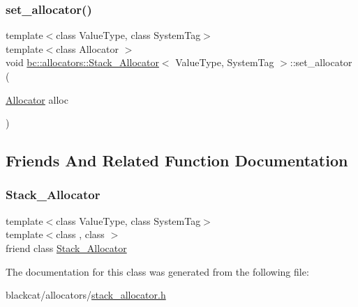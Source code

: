\subsubsection{\texorpdfstring{set\+\_\+allocator()}{set\_allocator()}}
{\footnotesize\ttfamily template$<$class Value\+Type, class System\+Tag$>$ \\
template$<$class Allocator $>$ \\
void \hyperlink{classbc_1_1allocators_1_1Stack__Allocator}{bc\+::allocators\+::\+Stack\+\_\+\+Allocator}$<$ Value\+Type, System\+Tag $>$\+::set\+\_\+allocator (\begin{DoxyParamCaption}\item[{\hyperlink{classbc_1_1allocators_1_1Allocator}{Allocator}}]{alloc }\end{DoxyParamCaption})\hspace{0.3cm}{\ttfamily [inline]}}



\subsection{Friends And Related Function Documentation}
\mbox{\label{classbc_1_1allocators_1_1Stack__Allocator_a0c884348ac6b6c3ee5c2ccc72115267e}} 
\subsubsection{\texorpdfstring{Stack\+\_\+\+Allocator}{Stack\_Allocator}}
{\footnotesize\ttfamily template$<$class Value\+Type, class System\+Tag$>$ \\
template$<$class , class $>$ \\
friend class \hyperlink{classbc_1_1allocators_1_1Stack__Allocator}{Stack\+\_\+\+Allocator}\hspace{0.3cm}{\ttfamily [friend]}}



The documentation for this class was generated from the following file\+:\begin{DoxyCompactItemize}
\item 
blackcat/allocators/\hyperlink{stack__allocator_8h}{stack\+\_\+allocator.\+h}\end{DoxyCompactItemize}
